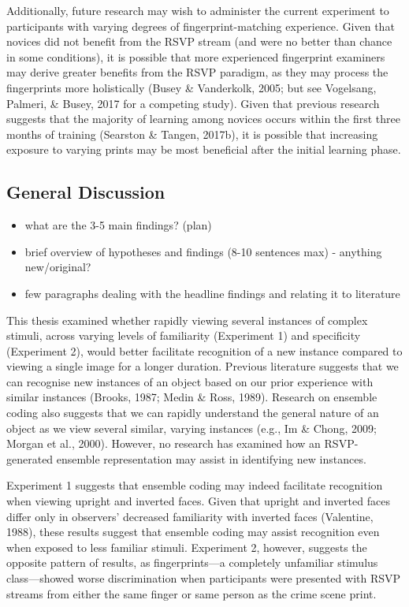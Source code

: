 \documentclass[
  english,
  man]{apa6}
\providecommand{\tightlist}{%
  \setlength{\itemsep}{0pt}\setlength{\parskip}{0pt}}
\begin{document}
Additionally, future research may wish to administer the current experiment to participants with varying degrees of fingerprint-matching experience. Given that novices did not benefit from the RSVP stream (and were no better than chance in some conditions), it is possible that more experienced fingerprint examiners may derive greater benefits from the RSVP paradigm, as they may process the fingerprints more holistically (Busey \& Vanderkolk, 2005; but see Vogelsang, Palmeri, \& Busey, 2017 for a competing study). Given that previous research suggests that the majority of learning among novices occurs within the first three months of training (Searston \& Tangen, 2017b), it is possible that increasing exposure to varying prints may be most beneficial after the initial learning phase.

\hypertarget{general-discussion}{%
\subsection{General Discussion}\label{general-discussion}}

\begin{itemize}
\tightlist
\item
  what are the 3-5 main findings? (plan)
\item
  brief overview of hypotheses and findings (8-10 sentences max) - anything new/original?
\item
  few paragraphs dealing with the headline findings and relating it to literature
\end{itemize}

This thesis examined whether rapidly viewing several instances of complex stimuli, across varying levels of familiarity (Experiment 1) and specificity (Experiment 2), would better facilitate recognition of a new instance compared to viewing a single image for a longer duration. Previous literature suggests that we can recognise new instances of an object based on our prior experience with similar instances (Brooks, 1987; Medin \& Ross, 1989). Research on ensemble coding also suggests that we can rapidly understand the general nature of an object as we view several similar, varying instances (e.g., Im \& Chong, 2009; Morgan et al., 2000). However, no research has examined how an RSVP-generated ensemble representation may assist in identifying new instances.

Experiment 1 suggests that ensemble coding may indeed facilitate recognition when viewing upright and inverted faces. Given that upright and inverted faces differ only in observers' decreased familiarity with inverted faces (Valentine, 1988), these results suggest that ensemble coding may assist recognition even when exposed to less familiar stimuli. Experiment 2, however, suggests the opposite pattern of results, as fingerprints---a completely unfamiliar stimulus class---showed worse discrimination when participants were presented with RSVP streams from either the same finger or same person as the crime scene print.
\end{document}
